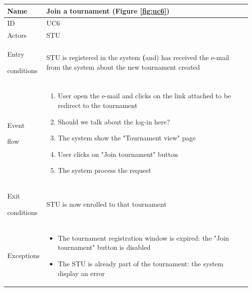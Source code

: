 \begin{center}
    \def\arraystretch{1.5}
    \begin{tabular}{| m{2cm} | m{10cm}|}
        \hline
        Name                  & Join a tournament  (Figure \ref{fig:uc6}) \\ \hline
        ID                    & UC6                                       \\ \hline
        Actors                & STU                                       \\ \hline
        Entry \par conditions & STU is registered in the system \textbf(and) has received the e-mail from the system about the new tournament created                                       \\ \hline
        Event \par flow       & \begin{enumerate}
                                    \item User open the e-mail and clicks on the link attached to be redirect to the tournament
                                    \item {\color{red} Should we talk about the log-in here?}
                                    \item The system show the "Tournament view" page
                                    \item User clicks on "Join tournament" button
                                    \item The system process the request 
                                \end{enumerate}                          \\ \hline
        Exit \par conditions  & STU is now enrolled to that tournament   \\ \hline
        Exceptions            & \begin{itemize}
                                    \item The tournament registration window is expired: the "Join tournament" button is disabled
                                    \item The STU is already part of the tournament: the system display an error 
                                \end{itemize}                            \\ \hline
    \end{tabular}
\end{center}

